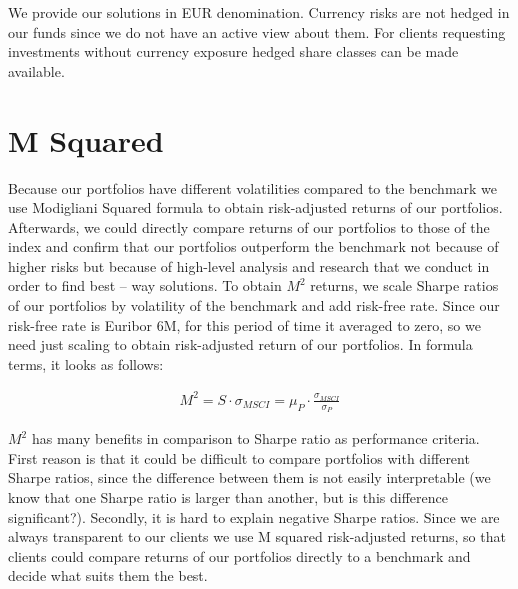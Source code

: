 \documentclass[11pt, DIV=15]{scrreprt}
\begin{document}
We provide our solutions in EUR denomination.
Currency risks are not hedged in our funds since we do not have an active view about them.
For clients requesting investments without currency exposure hedged share classes can be made available.


\chapter*{M Squared}
Because our portfolios have different volatilities compared to the benchmark we use Modigliani Squared formula to obtain risk-adjusted returns of our portfolios. Afterwards, we could directly compare returns of our portfolios to those of the index and confirm that our portfolios outperform the benchmark not because of higher risks but because of high-level analysis and research that we conduct in order to find best – way solutions. To obtain $M^2$ returns, we scale Sharpe ratios of our portfolios by volatility of the benchmark and add risk-free rate. Since our risk-free rate is Euribor 6M, for this period of time it averaged to zero, so we need just scaling to obtain risk-adjusted return of our portfolios. In formula terms, it looks as follows:

\begin{align*}
  M^2 = S \cdot \sigma_{MSCI} = \mu_P \cdot \frac{\sigma_{MSCI}}{\sigma_P}
\end{align*}

$M^2$ has many benefits in comparison to Sharpe ratio as performance criteria.  First reason is that it could be difficult to compare portfolios with different Sharpe ratios, since the difference between them is not easily interpretable (we know that one Sharpe ratio is larger than another, but is this difference significant?). Secondly, it is hard to explain negative Sharpe ratios. Since we are always transparent to our clients we use M squared risk-adjusted returns, so that clients could compare returns of our portfolios directly to a benchmark and decide what suits them the best.
\end{document}
